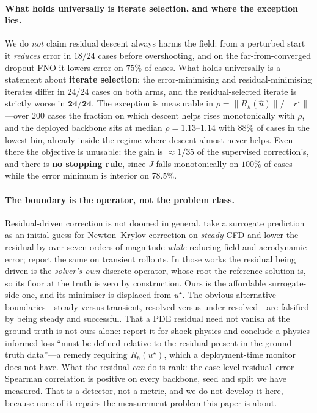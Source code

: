 \paragraph{What holds universally is iterate selection, and where the exception lies.} We
do \emph{not} claim residual descent always harms the field: from a perturbed start it
\emph{reduces} error in $18/24$ cases before overshooting, and on the far-from-converged
dropout-FNO it lowers error on $75\%$ of cases. What holds universally is a statement about
\textbf{iterate selection}: the error-minimising and residual-minimising iterates differ in
$24/24$ cases on both arms, and the residual-selected iterate is strictly worse in
$\mathbf{24/24}$. The exception is measurable in
$\rho=\|R_h(\hat u)\|/\|r^\star\|$---over $200$ cases the fraction on which descent helps
rises monotonically with $\rho$, and the deployed backbone sits at median
$\rho=1.13$--$1.14$ with $88\%$ of cases in the lowest bin, already inside the regime where
descent almost never helps. Even there the objective is unusable: the gain is
${\approx}1/35$ of the supervised correction's, and there is \textbf{no stopping rule}, since
$J$ falls monotonically on $100\%$ of cases while the error minimum is interior on
$78.5\%$.

\paragraph{The boundary is the operator, not the problem class.} Residual-driven
correction is not doomed in general. \citet{lei2026newtonkrylov} take a surrogate
prediction as an initial guess for Newton--Krylov correction on \emph{steady} CFD and lower
the residual by over seven orders of magnitude \emph{while} reducing field and aerodynamic
error; \citet{huang2025physicscorrect} report the same on transient rollouts. In those
works the residual being driven is the \emph{solver's own} discrete operator, whose root
the reference solution is, so its floor at the truth is zero by construction. Ours is the
affordable surrogate-side one, and its minimiser is displaced from $u^\star$. The obvious
alternative boundaries---steady versus transient, resolved versus under-resolved---are
falsified by \citet{lei2026newtonkrylov} being steady and successful. That a PDE residual
need not vanish at the ground truth is not ours alone: \citet{zhang2026phymgn} report it
for shock physics and conclude a physics-informed loss ``must be defined relative to the
residual present in the ground-truth data''---a remedy requiring $R_h(u^\star)$, which a
deployment-time monitor does not have. What the residual \emph{can} do is rank: the
case-level residual--error Spearman correlation is positive on every backbone, seed and
split we have measured. That is a detector, not a metric, and we do not develop it here,
because none of it repairs the measurement problem this paper is about.

